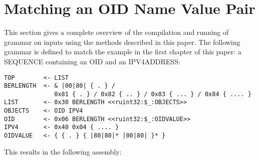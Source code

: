 \section{Matching an OID Name Value Pair}
\label{sec:app:d}

This section gives a complete overview of the compilation and running of
grammar on inputs using the methods described in this paper.
The following grammar is defined to match the example in the first
chapter of this paper: a SEQUENCE containing an OID and an IPV4ADDRESS:

\begin{changemargin}{-60mm}{0mm}
\begin{myquote}
\begin{verbatim}
TOP        <- LIST
BERLENGTH  <- & |00|80| { . } /
              0x81 { . } / 0x82 { .. } / 0x83 { ... } / 0x84 { .... }
LIST       <- 0x30 BERLENGTH <<ruint32:$_:OBJECTS>>
OBJECTS    <- OID IPV4
OID        <- 0x06 BERLENGTH <<ruint32:$_:OIDVALUE>>
IPV4       <- 0x40 0x04 { .... }
OIDVALUE   <- { { . } { |80|80|* |00|80| }* }
\end{verbatim}
\end{myquote}
\end{changemargin}

This results in the following assembly:


